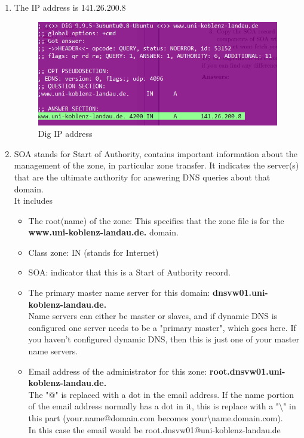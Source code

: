 \documentclass{WeSTassignment}
\begin{document}
\begin{enumerate}
\item The IP address is 141.26.200.8 \\
\begin{figure}[h]
  \centering
  \includegraphics{dig.png}
   \caption{Dig IP address}
     \label{fig:dig} 
\end{figure}

\item SOA stands for Start of Authority, contains important information about the management of the zone, in particular zone transfer. It indicates the server(s) that are the ultimate authority for answering DNS queries about that domain.
\\ It includes
\begin{itemize}

\item The root(name) of the zone: This specifies that the zone file is for the \textbf{www.uni-koblenz-landau.de.} domain.

\item Class zone: IN (stands for Internet) 
\item SOA: indicator that this is a Start of Authority record.

\item The primary master name server for this domain: \textbf{dnsvw01.uni-koblenz-landau.de.}\\ Name servers can either be master or slaves, and if dynamic DNS is configured one server needs to be a "primary master", which goes here. If you haven't configured dynamic DNS, then this is just one of your master name servers.

\item Email address of the administrator for this zone: \textbf{root.dnsvw01.uni-koblenz-landau.de.} \\The "@" is replaced with a dot in the email address. If the name portion of the email address normally has a dot in it, this is replace with a "\textbackslash" in this part (your.name@domain.com becomes your\textbackslash name.domain.com).
\\ In this case the email would be root.dnsvw01@uni-koblenz-landau.de


\end{itemize}
\end{enumerate}
\end{document}
